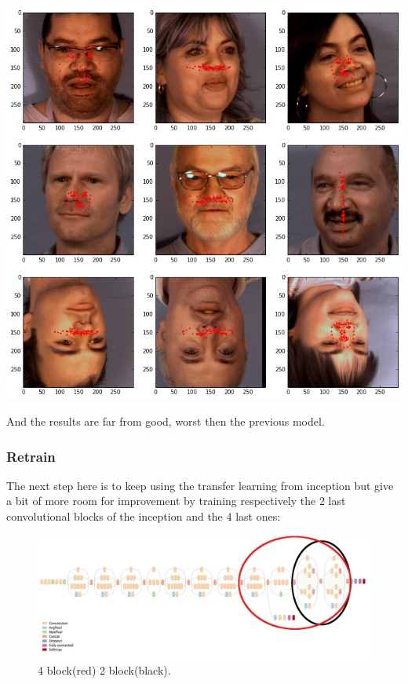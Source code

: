 \documentclass[11pt]{article}
\begin{document}
\begin{center}
\includegraphics[width=.9\linewidth]{./images/btnResult.png}
\end{center}

And the results are far from good, worst then the previous model. 

\pagebreak


\subsubsection{Retrain}
\label{sec:orgdbb0adb}

The next step here is to keep using the transfer learning from inception but
give a bit of more room for improvement by training respectively the 2 last
convolutional blocks of the inception and the 4 last ones:

\begin{figure}[htbp]
\centering
\includegraphics[width=.9\linewidth]{./images/incep.png}
\caption{4 block(red) 2 block(black).}
\end{figure}
\end{document}
